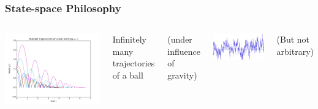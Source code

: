\documentclass[12pt]{beamer}
\begin{document}
\begin{frame}
\frametitle{State-space Philosophy}

\begin{columns}

\centering
\includegraphics[width=\linewidth]{bouncing_ball_flat}

Infinitely many trajectories of a ball

(under influence of gravity)

\centering
\includegraphics[width=\linewidth]{pink.png}

(But not arbitrary)

\end{columns}


\end{frame}
\end{document}
